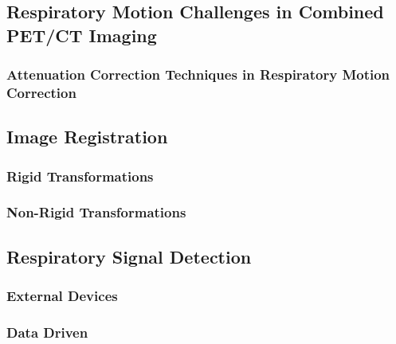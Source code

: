             
        \subsection{Respiratory Motion Challenges in Combined PET/CT Imaging} \label{sec:respiratory_motion_challenges_in_combined_pet_ct_imaging}
            
            
            \subsubsection{Attenuation Correction Techniques in Respiratory Motion Correction} \label{sec:attenuation_correction_techniques_in_respiratory_motion_correction}
                
    
        
    
        \subsection{Image Registration} \label{sec:image_registration}
            
            
            \subsubsection{Rigid Transformations} \label{sec:rigid_transformations}
                
                
            \subsubsection{Non-Rigid Transformations} \label{sec:non_rigid_transformations}
                
            
        \subsection{Respiratory Signal Detection} \label{sec:respiratory_signal_detection}
            
            
            \subsubsection{External Devices} \label{sec:external_devices}
                
                
            \subsubsection{Data Driven} \label{sec:data_driven}
                
